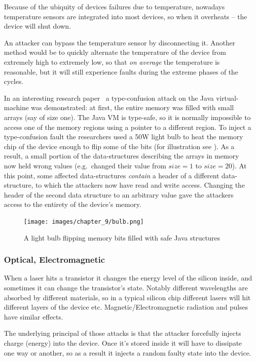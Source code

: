 Because of the ubiquity of devices failures due to temperature, nowadays
temperature sensors are integrated into most devices, so when it overheats --
the device will shut down.

An attacker can bypass the temperature sensor by disconnecting it. Another
method would be to quickly alternate the temperature of the device from
extremely high to extremely low, so that \emph{on average} the temperature is
reasonable, but it will still experience faults during the extreme phases of the
cycles.

In an interesting research paper~\cite{appel} a type-confusion attack on the
Java virtual-machine was demonstrated: at first, the entire memory was filled
with small arrays (say of size one). The Java VM is type-safe, so it is normally
impossible to access one of the memory regions using a pointer to a different
region. To inject a type-confusion fault the researchers used a 50W light bulb
to heat the memory chip of the device enough to flip some of the bits (for
illustration see ). As a result, a small portion of
the data-structures describing the arrays in memory now held wrong values (e.g.\
changed their value from \(size=1\) to \(size=20\)). At this point, some
affected data-structures \emph{contain} a header of a different data-structure,
to which the attackers now have read and write access. Changing the header of
the second data structure to an arbitrary value gave the attackers access to the
entirety of the device's memory.

\begin{figure}[!ht]
	\centering
	\texttt{[image: images/chapter\_9/bulb.png]}
	\caption{A light bulb flipping memory bits filled with safe Java structures}\label{fig:memory_lightbulb}
\end{figure}

\subsubsection{Optical, Electromagnetic}\label{subsubsec:optical_electromagnetic}
When a laser hits a transistor it changes the energy level of the silicon
inside, and sometimes it can change the transistor's state. Notably different
wavelengths are absorbed by different materials, so in a typical silicon chip
different lasers will hit different layers of the device etc.
Magnetic/Electromagnetic radiation and pulses have similar effects.

The underlying principal of those attacks is that the attacker forcefully
injects charge (energy) into the device. Once it's stored inside it will have to
dissipate one way or another, so as a result it injects a random faulty state
into the device.

